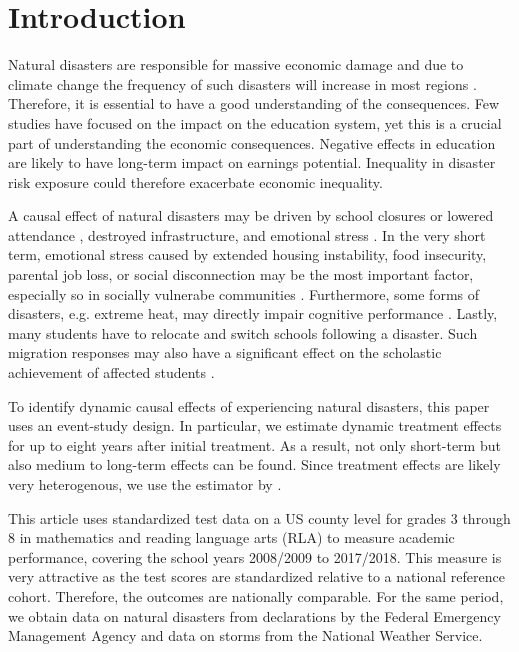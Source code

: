 
\section{Introduction}

Natural disasters are responsible for massive economic damage and due to climate change the frequency of such disasters will increase in most regions \citep{IPCC_2021}. Therefore, it is essential to have a good understanding of the consequences. Few studies have focused on the impact on the education system, yet this is a crucial part of understanding the economic consequences. Negative effects in education are likely to have long-term impact on earnings potential. Inequality in disaster risk exposure could therefore exacerbate economic inequality.

A causal effect of natural disasters may be driven by school closures \citep{Grewening_2020} or lowered attendance \citep{Spencer_2016}, destroyed infrastructure, and emotional stress \citep{Vogel_2016}. In the very short term, emotional stress caused by extended housing instability, food insecurity, parental job loss, or social disconnection may be the most important factor, especially so in socially vulnerabe communities \citep{Gao_2022}. Furthermore, some forms of disasters, e.g. extreme heat, may directly impair cognitive performance \citep{Ramsey_1995}. Lastly, many students have to relocate and switch schools following a disaster. Such migration responses may also have a significant effect on the scholastic achievement of affected students \citep{Pane_2008, Sacerdote_2012}.

To identify dynamic causal effects of experiencing natural disasters, this paper uses an event-study design. In particular, we estimate dynamic treatment effects for up to eight years after initial treatment. As a result, not only short-term but also medium to long-term effects can be found. Since treatment effects are likely very heterogenous, we use the estimator by \cite{Sun_2021}. 

This article uses standardized test data on a US county level for grades 3 through 8 in mathematics and reading language arts (RLA) to measure academic performance, covering the school years 2008/2009 to 2017/2018. This measure is very attractive as the test scores are standardized relative to a national reference cohort. Therefore, the outcomes are nationally comparable. For the same period, we obtain data on natural disasters from declarations by the Federal Emergency Management Agency and data on storms from the National Weather Service.

